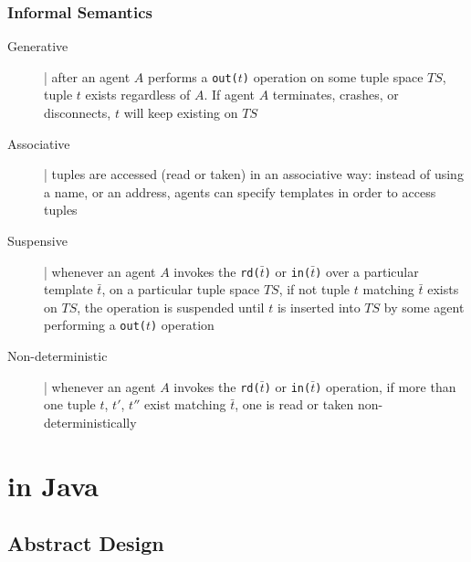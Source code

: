 \documentclass[presentation]{beamer}\mode<presentation>{\usetheme{AMSCesenaPurpleAndGold}}
\begin{document}
\begin{frame}[fragile]
\frametitle{\linda{} Informal Semantics}
\label{linda-semantics}

	\begin{description}
		\item[Generative] | after an agent $A$ performs a \texttt{out($t$)} operation on some tuple space $TS$, tuple $t$ \alert{exists} regardless of $A$.
		If agent $A$ terminates, crashes, or disconnects, $t$ will keep existing on $TS$

		\item[Associative] | tuples are \alert{accessed} (read or taken) in an associative way: instead of using a name, or an address, agents can specify \alert{templates} in order to access tuples

		\item[Suspensive] | whenever an agent $A$ invokes the \texttt{rd($\bar{t}$)} or \texttt{in($\bar{t}$)} over a particular template $\bar{t}$, on a particular tuple space $TS$, if not tuple $t$ matching $\bar{t}$ exists on $TS$, the operation is \alert{suspended} until $t$ is inserted into $TS$ by some agent performing a \texttt{out($t$)} operation

		\item[Non-deterministic] | whenever an agent $A$ invokes the \texttt{rd($\bar{t}$)} or \texttt{in($\bar{t}$)} operation, if more than one tuple $t$, $t'$, $t''$ exist matching  $\bar{t}$, one is read or taken  \alert{non-deterministically}

	\end{description}

\end{frame}


\section{\linda{} in Java}

\subsection{Abstract Design}
\end{document}
